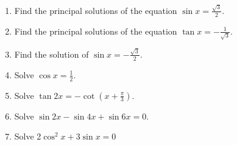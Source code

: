 
\begin{enumerate}[label=\thesubsection.\arabic*.,ref=\thesubsection.\theenumi]
\item Find the principal solutions of the equation $\sin x = \frac{\sqrt 3}{2}$.
%
%
\item Find the principal solutions of the equation $\tan x = -\frac{1}{\sqrt 3}$.
%
%
\item Find the solution of $\sin x = -\frac{\sqrt 3}{2}$.
%
%
\item Solve $\cos x = \frac{1}{2}$.
%
%
\item Solve $\tan2x=-\cot(x+\frac{\pi}{3})$.
%
\item Solve $\sin2x-\sin4x+\sin6x=0$.
%
%
\item Solve 2$\cos^{2}x+3\sin x=0$
%
\end{enumerate}
